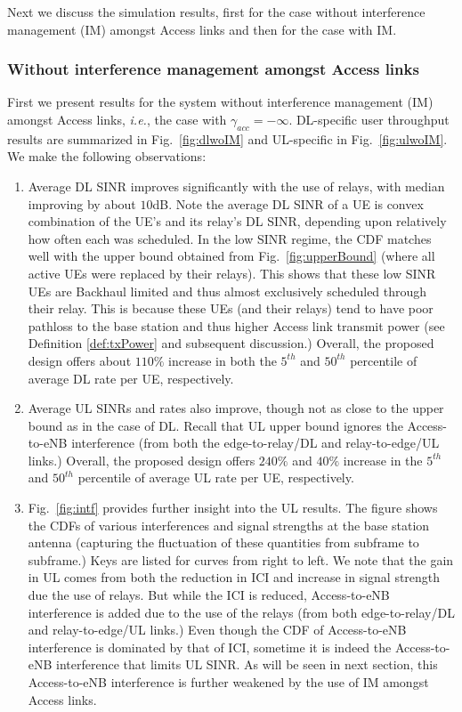 \documentclass[journal]{IEEEtran}
\newcommand{\ie}{\emph{i.e.}}
\begin{document}
Next we discuss the simulation results, first for the case without interference management (IM) amongst Access links and then for the case with IM.



\subsubsection{Without interference management amongst Access links}
First we present results for the system without interference management (IM) amongst Access links, \ie, the case with $\gamma_{acc}=-\infty$.  DL-specific user throughput results are summarized in Fig.~\ref{fig:dlwoIM} and UL-specific in Fig.~\ref{fig:ulwoIM}.  We make the following observations:
\begin{enumerate}
  \item Average DL SINR improves significantly with the use of relays, with median improving by about $10$dB.  Note the average DL SINR of a UE is convex combination of the UE's and its relay's DL SINR, depending upon relatively how often each was scheduled.  In the low SINR regime, the CDF matches well with the upper bound obtained from Fig.~\ref{fig:upperBound} (where all active UEs were replaced by their relays).  This shows that these low SINR UEs are Backhaul limited and thus almost exclusively scheduled through their relay. This is because these UEs (and their relays) tend to have poor pathloss to the base station and thus higher Access link transmit power (see Definition \ref{def:txPower} and subsequent discussion.)  Overall, the proposed design offers about $110\%$ increase in both the $5^{th}$ and $50^{th}$ percentile of average DL rate per UE, respectively.
  \item Average UL SINRs and rates also improve, though not as close to the upper bound as in the case of DL. Recall that UL upper bound ignores the Access-to-eNB interference (from both the edge-to-relay/DL and relay-to-edge/UL links.)
Overall, the proposed design offers $240\%$ and $40\%$ increase in the $5^{th}$ and $50^{th}$ percentile of average UL rate per UE, respectively.
  \item Fig.~\ref{fig:intf} provides further insight into the UL results.  The figure shows the CDFs of various interferences and signal strengths at the base station antenna (capturing the fluctuation of these quantities from subframe to subframe.)  Keys are listed for curves from right to left.  We note that the gain in UL comes from both the reduction in ICI and increase in signal strength due the use of relays.  But while the ICI is reduced, Access-to-eNB interference is added due to the use of the relays (from both edge-to-relay/DL and relay-to-edge/UL links.)  Even though the CDF of Access-to-eNB interference is dominated by that of ICI, sometime it is indeed the Access-to-eNB interference that limits UL SINR.  As will be seen in next section, this Access-to-eNB interference is further weakened by the use of IM amongst Access links.

\end{enumerate}
\end{document}
